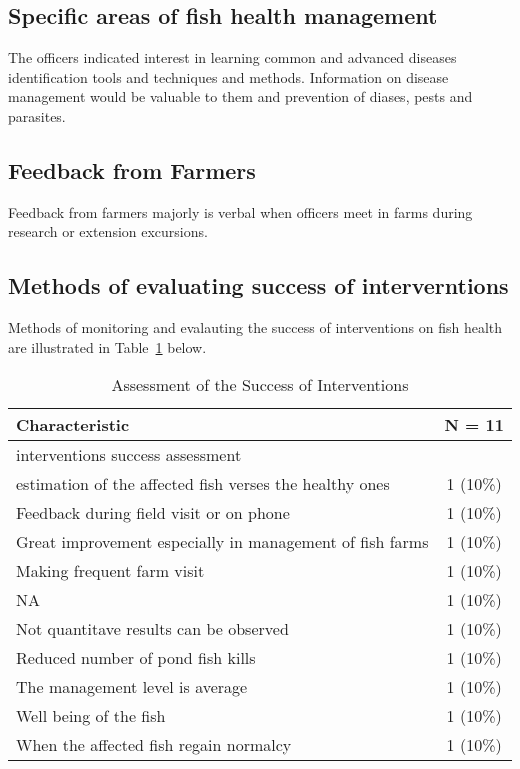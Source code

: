 \documentclass[
  letterpaper,
  DIV=11,
  numbers=noendperiod]{scrartcl}
\begin{document}
\subsection{Specific areas of fish health
management}\label{specific-areas-of-fish-health-management}

The officers indicated interest in learning common and advanced diseases
identification tools and techniques and methods. Information on disease
management would be valuable to them and prevention of diases, pests and
parasites.

\subsection{Feedback from Farmers}\label{feedback-from-farmers}

Feedback from farmers majorly is verbal when officers meet in farms
during research or extension excursions.

\subsection{Methods of evaluating success of
interverntions}\label{methods-of-evaluating-success-of-interverntions}

Methods of monitoring and evalauting the success of interventions on
fish health are illustrated in Table~\ref{tbl-success} below.

\begin{longtable}[]{@{}lc@{}}

\caption{\label{tbl-success}Assessment of the Success of Interventions}

\tabularnewline

\toprule\noalign{}
\textbf{Characteristic} & \textbf{N = 11} \\
\midrule\noalign{}
\endhead
\bottomrule\noalign{}
\endlastfoot
interventions success assessment & \\
estimation of the affected fish verses the healthy ones & 1 (10\%) \\
Feedback during field visit or on phone & 1 (10\%) \\
Great improvement especially in management of fish farms & 1 (10\%) \\
Making frequent farm visit & 1 (10\%) \\
NA & 1 (10\%) \\
Not quantitave results can be observed & 1 (10\%) \\
Reduced number of pond fish kills & 1 (10\%) \\
The management level is average & 1 (10\%) \\
Well being of the fish & 1 (10\%) \\
When the affected fish regain normalcy & 1 (10\%) \\

\end{longtable}
\end{document}
